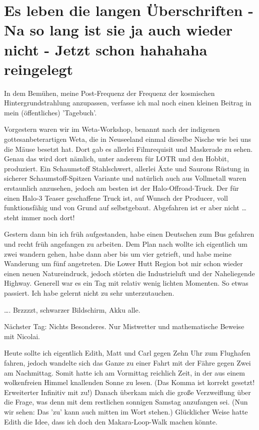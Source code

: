 \chapter[Es leben die langen \"Uberschriften]{Es leben die langen \"Uberschriften - Na so lang ist sie ja auch wieder nicht - Jetzt schon hahahaha reingelegt}

In dem Bemühen, meine Post-Frequenz der Frequenz der kosmischen
Hintergrundstrahlung anzupassen, verfasse ich mal noch einen kleinen
Beitrag in mein (öffentliches) 'Tagebuch'.

Vorgestern waren wir im Weta-Workshop, benannt nach der indigenen
gottesanbeterartigen Weta, die in Neuseeland einmal dieselbe Nische wie
bei uns die Mäuse besetzt hat. Dort gab es allerlei Filmrequisit und
Maskerade zu sehen. Genau das wird dort nämlich, unter anderem für LOTR
und den Hobbit, produziert. Ein Schaumstoff Stahlschwert, allerlei Äxte
und Saurons Rüstung in sicherer Schaumstoff-Spitzen Variante und
natürlich auch aus Vollmetall waren erstaunlich anzusehen, jedoch am
besten ist der Halo-Offroad-Truck. Der für einen Halo-3 Teaser
geschaffene Truck ist, auf Wunsch der Producer, voll funktionsfähig und
von Grund auf selbstgebaut. Abgefahren ist er aber nicht \ldots{} steht
immer noch dort!

Gestern dann bin ich früh aufgestanden, habe einen Deutschen zum Bus
gefahren und recht früh angefangen zu arbeiten. Dem Plan nach wollte ich
eigentlich um zwei wandern gehen, habe dann aber bis um vier getrieft,
und habe meine Wanderung um fünf angetreten. Die Lower Hutt Region bot
mir schon wieder einen neuen Natureindruck, jedoch störten die
Industrieluft und der Naheliegende Highway. Generell war es ein Tag mit
relativ wenig lichten Momenten. So etwas passiert. Ich habe gelernt
nicht zu sehr unterzutauchen.

\ldots. Brzzzzt, schwarzer Bildschirm, Akku alle.

Nächster Tag: Nichts Besonderes. Nur Mistwetter und mathematische
Beweise mit Nicolai.

Heute sollte ich eigentlich Edith, Matt und Carl gegen Zehn Uhr zum
Flughafen fahren, jedoch wandelte sich das Ganze zu einer Fahrt mit der
Fähre gegen Zwei am Nachmittag. Somit hatte ich am Vormittag reichlich
Zeit, in der aus einem wolkenfreien Himmel knallenden Sonne zu lesen.
(Das Komma ist korrekt gesetzt! Erweiterter Infinitiv mit zu!) Danach
überkam mich die große Verzweiflung über die Frage, was denn mit dem
restlichen sonnigen Samstag anzufangen sei. (Nun wir sehen: Das 'zu'
kann auch mitten im Wort stehen.) Glücklicher Weise hatte Edith die
Idee, dass ich doch den Makara-Loop-Walk machen könnte.

